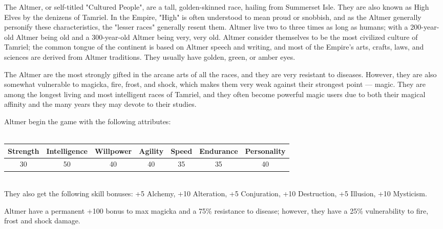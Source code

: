 \documentclass[12pt]{article}
\begin{document}
The Altmer, or self-titled "Cultured People", are a tall, golden-skinned race, hailing from Summerset Isle. They are also known as High Elves by the denizens of Tamriel. In the Empire, "High" is often understood to mean proud or snobbish, and as the Altmer generally personify these characteristics, the "lesser races" generally resent them. Altmer live two to three times as long as humans; with a 200-year-old Altmer being old and a 300-year-old Altmer being very, very old. Altmer consider themselves to be the most civilized culture of Tamriel; the common tongue of the continent is based on Altmer speech and writing, and most of the Empire's arts, crafts, laws, and sciences are derived from Altmer traditions. They usually have golden, green, or amber eyes.

The Altmer are the most strongly gifted in the arcane arts of all the races, and they are very resistant to diseases. However, they are also somewhat vulnerable to magicka, fire, frost, and shock, which makes them very weak against their strongest point --- magic. They are among the longest living and most intelligent races of Tamriel, and they often become powerful magic users due to both their magical affinity and the many years they may devote to their studies.

Altmer begin the game with the following attributes:\\~\\
\begin{tabular}{|c|c|c|c|c|c|c|}
\hline
Strength & Intelligence & Willpower & Agility & Speed & Endurance & Personality\\ \hline
30 & 50 & 40 & 40 & 35 & 35 & 40\\ \hline

\end{tabular}\\

They also get the following skill bonuses: +5 Alchemy, +10 Alteration, +5 Conjuration, +10 Destruction, +5 Illusion, +10 Mysticism.

Altmer have a permanent +100 bonus to max magicka and a 75\% resistance to disease; however, they have a 25\% vulnerability to fire, frost and shock damage.\\
\end{document}
